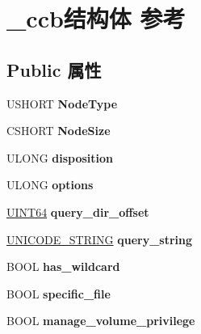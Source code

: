 \hypertarget{struct__ccb}{}\section{\+\_\+ccb结构体 参考}
\label{struct__ccb}
\subsection*{Public 属性}
\begin{DoxyCompactItemize}
\item 
\mbox{\label{struct__ccb_aca0a37436d1f8ae39f1aee7446638b2f}} 
U\+S\+H\+O\+RT {\bfseries Node\+Type}
\item 
\mbox{\label{struct__ccb_a050224a59e30305443ec893994777e57}} 
C\+S\+H\+O\+RT {\bfseries Node\+Size}
\item 
\mbox{\label{struct__ccb_a218398a593c3587db0536d55f523599c}} 
U\+L\+O\+NG {\bfseries disposition}
\item 
\mbox{\label{struct__ccb_affefd0fd627270c2dffdb4f0b5530128}} 
U\+L\+O\+NG {\bfseries options}
\item 
\mbox{\label{struct__ccb_aad5ef974e47d469e3400063d89a766f0}} 
\hyperlink{_processor_bind_8h_a57be03562867144161c1bfee95ca8f7c}{U\+I\+N\+T64} {\bfseries query\+\_\+dir\+\_\+offset}
\item 
\mbox{\label{struct__ccb_abe9e81605940a911e35d13a08fd5e09c}} 
\hyperlink{struct___u_n_i_c_o_d_e___s_t_r_i_n_g}{U\+N\+I\+C\+O\+D\+E\+\_\+\+S\+T\+R\+I\+NG} {\bfseries query\+\_\+string}
\item 
\mbox{\label{struct__ccb_a62e338f86a36f5c1a5ea764d4cd0ad25}} 
B\+O\+OL {\bfseries has\+\_\+wildcard}
\item 
\mbox{\label{struct__ccb_a24c559453be61c5c0cf56a5bcb8f551c}} 
B\+O\+OL {\bfseries specific\+\_\+file}
\item 
\mbox{\label{struct__ccb_a7bad5f5e08403d28d01cb7ac31c6972f}} 
B\+O\+OL {\bfseries manage\+\_\+volume\+\_\+privilege}
\item 
\mbox{\label{struct__ccb_acfe2ac026637652d8e0b8bab0a4142dd}} 

\end{DoxyCompactItemize}
